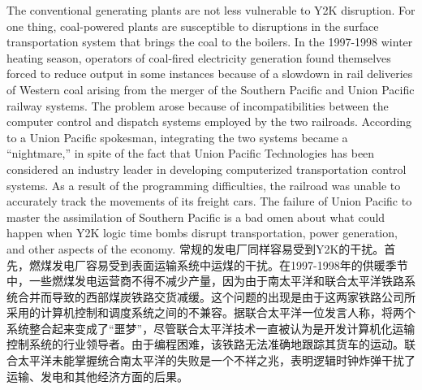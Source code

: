 \begin{Parallel}{97mm}{45mm}
  \ParallelLText
  {The conventional generating plants are not less vulnerable to Y2K disruption. For one thing, coal-powered plants are susceptible to disruptions in the surface transportation system that brings the coal to the boilers. In the 1997-1998 winter heating season, operators of coal-fired electricity generation found themselves forced to reduce output in some instances because of a slowdown in rail deliveries of Western coal arising from the merger of the Southern Pacific and Union Pacific railway systems. The problem arose because of incompatibilities between the computer control and dispatch systems employed by the two railroads. According to a Union Pacific spokesman, integrating the two systems became a “nightmare,” in spite of the fact that Union Pacific Technologies has been considered an industry leader in developing computerized transportation control systems. As a result of the programming difficulties, the railroad was unable to accurately track the movements of its freight cars. The failure of Union Pacific to master the assimilation of Southern Pacific is a bad omen about what could happen when Y2K logic time bombs disrupt transportation, power generation, and other aspects of the economy.}  
  \ParallelRText
  {\small 常规的发电厂同样容易受到Y2K的干扰。首先，燃煤发电厂容易受到表面运输系统中运煤的干扰。在1997-1998年的供暖季节中，一些燃煤发电运营商不得不减少产量，因为由于南太平洋和联合太平洋铁路系统合并而导致的西部煤炭铁路交货减缓。这个问题的出现是由于这两家铁路公司所采用的计算机控制和调度系统之间的不兼容。据联合太平洋一位发言人称，将两个系统整合起来变成了“噩梦”，尽管联合太平洋技术一直被认为是开发计算机化运输控制系统的行业领导者。由于编程困难，该铁路无法准确地跟踪其货车的运动。联合太平洋未能掌握统合南太平洋的失败是一个不祥之兆，表明逻辑时钟炸弹干扰了运输、发电和其他经济方面的后果。}
  \ParallelPar



\end{Parallel}

